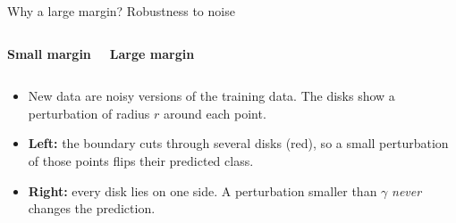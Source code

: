 \documentclass[aspectratio=169,10pt]{beamer}
\newcommand{\axes}{%
  \draw[->,gray] (-0.2,0) -- (6.3,0) node[below] {\scriptsize $x_1$};
  \draw[->,gray] (0,-0.2) -- (0,6.3) node[left] {\scriptsize $x_2$};
}
\newcommand{\posdata}{%
  \foreach \p in {(3,3),(4,2),(5,4),(4.5,3),(3.5,4.5),(5.5,2.2)} \node[ptpos] at \p {};
}
\newcommand{\negdata}{%
  \foreach \p in {(1,1),(0.5,1.5),(0.4,0.6),(1.2,0.3),(0.2,1.2)} \node[ptneg] at \p {};
}
\newcommand{\balls}[1]{%
  \foreach \p in {(3,3),(4,2),(5,4),(4.5,3),(3.5,4.5),(5.5,2.2),(1,1),(0.5,1.5),(0.4,0.6),(1.2,0.3),(0.2,1.2)}
    \fill[#1,opacity=0.18] \p circle (0.7);}
\begin{document}
\begin{frame}{Why a large margin? Robustness to noise}
\begin{columns}[T]
\centering
\textbf{Small margin}\\[3pt]
\centering
\textbf{Large margin}\\[3pt]
\end{columns}
\vspace{4pt}
\small
\begin{itemize}
  \item New data are noisy versions of the training data. The disks show a perturbation of radius $r$ around each point.
  \item \textbf{Left:} the boundary cuts through several disks (red), so a small perturbation of those points flips their predicted class.
  \item \textbf{Right:} every disk lies on one side. A perturbation smaller than $\gamma$ \emph{never} changes the prediction.
\end{itemize}
\end{frame}
\end{document}
